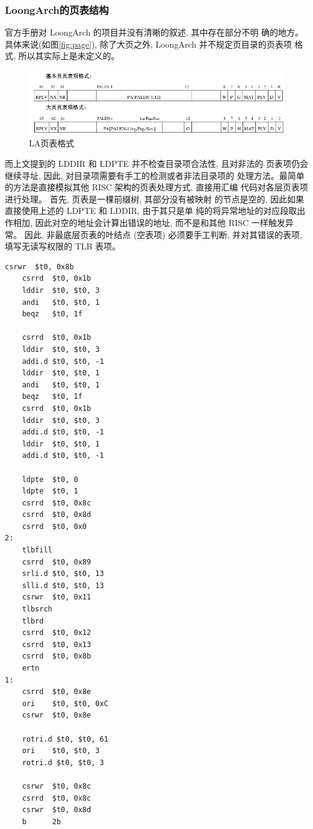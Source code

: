 \subsubsection{LoongArch的页表结构}
官方手册对 LoongArch 的项目并没有清晰的叙述, 其中存在部分不明
确的地方。 具体来说(如图\autoref{fig:page}), 除了大页之外, LoongArch 并不规定页目录的页表项
格式, 所以其实际上是未定义的。
\begin{figure}
    \centering
    \label{fig:page}
    \includegraphics[width=1\linewidth]{figs/页表格式.png}
    \caption{LA页表格式}
\end{figure}
而上文提到的 LDDIR 和 LDPTE 并不检查目录项合法性, 且对非法的
页表项仍会继续寻址, 因此, 对目录项需要有手工的检测或者非法目录项的
处理方法。最简单的方法是直接模拟其他 RISC 架构的页表处理方式, 直接用汇编
代码对各层页表项进行处理。 首先, 页表是一棵前缀树, 其部分没有被映射
的节点是空的, 因此如果直接使用上述的 LDPTE 和 LDDIR, 由于其只是单
纯的将异常地址的对应段取出作相加, 因此对空的地址会计算出错误的地址,
而不是和其他 RISC 一样触发异常。 因此, 非最底层页表的叶结点 (空表项)
必须要手工判断, 并对其错误的表项, 填写无读写权限的 TLB 表项。

\begin{lstlisting}[language={riscv}, label={code:refill},
	caption={TLB refill}]
    csrwr  $t0, 0x8b
    csrrd  $t0, 0x1b
    lddir  $t0, $t0, 3
    andi   $t0, $t0, 1
    beqz   $t0, 1f

    csrrd  $t0, 0x1b
    lddir  $t0, $t0, 3
    addi.d $t0, $t0, -1
    lddir  $t0, $t0, 1
    andi   $t0, $t0, 1
    beqz   $t0, 1f
    csrrd  $t0, 0x1b
    lddir  $t0, $t0, 3
    addi.d $t0, $t0, -1
    lddir  $t0, $t0, 1
    addi.d $t0, $t0, -1

    ldpte  $t0, 0
    ldpte  $t0, 1
    csrrd  $t0, 0x8c
    csrrd  $t0, 0x8d
    csrrd  $t0, 0x0
2:
    tlbfill
    csrrd  $t0, 0x89
    srli.d $t0, $t0, 13
    slli.d $t0, $t0, 13
    csrwr  $t0, 0x11
    tlbsrch
    tlbrd
    csrrd  $t0, 0x12
    csrrd  $t0, 0x13
    csrrd  $t0, 0x8b
    ertn
1:
    csrrd  $t0, 0x8e
    ori    $t0, $t0, 0xC
    csrwr  $t0, 0x8e

    rotri.d $t0, $t0, 61
    ori    $t0, $t0, 3
    rotri.d $t0, $t0, 3

    csrwr  $t0, 0x8c
    csrrd  $t0, 0x8c
    csrwr  $t0, 0x8d
    b      2b
\end{lstlisting}

